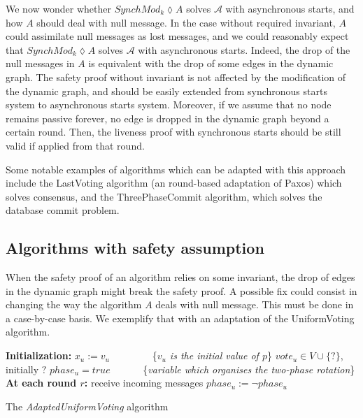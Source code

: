 \documentclass[11pt,letterpaper]{article}
\begin{document}
We now wonder whether $SynchMod_k \lozenge A$ solves $\mathcal{A}$ with asynchronous starts, and how $A$ should deal with null message.
In the case without required invariant, $A$ could assimilate null messages as lost messages,
and we could reasonably expect that $SynchMod_k \lozenge A$ solves $\mathcal{A}$ with asynchronous starts.
Indeed, the drop of the null messages in $A$ is equivalent with the drop of some edges in the dynamic graph.
The safety proof without invariant is not affected by the modification of the dynamic graph, and should be easily extended from synchronous starts system to asynchronous starts system.
Moreover, if we assume that no node remains passive forever, no edge is dropped in the dynamic graph beyond a certain round.
Then, the liveness proof with synchronous starts should be still valid if applied from that round.

Some notable examples of algorithms which can be adapted with this approach include the LastVoting \cite{CBS09} algorithm (an round-based adaptation of Paxos) which solves consensus,
and the ThreePhaseCommit \cite{BT93} algorithm, which solves the database commit problem.

\subsection{Algorithms with safety assumption}

When the safety proof of an algorithm relies on some invariant, the drop of edges in the dynamic graph might break the safety proof.
A possible fix could consist in changing the way the algorithm $A$ deals with null message. This must be done in a case-by-case basis.
We exemplify that with an adaptation of the UniformVoting \cite{CBS09} \cite{Ben83} algorithm.


\begin{algorithm}[htb]
	\DontPrintSemicolon
	\textbf{Initialization:} \;
	\Indp
		$x_u := v_u$ ~~~~~~~~\{\emph{$v_u$ is the initial value of $p$}\} \;
		$vote_u \in V\cup\{ ? \}$, initially $?$ \;
		$phase_u = true$ ~~~~~~\{\textit{variable which organises the two-phase rotation}\} \;
	\BlankLine
	\Indm
	\textbf{At each round $r$:} \;
	\Indp
		receive incoming messages \;
		$phase_u := \neg phase_u$ \;
	\Indm
\caption{The {\em AdaptedUniformVoting} algorithm}
\end{algorithm}
\end{document}
